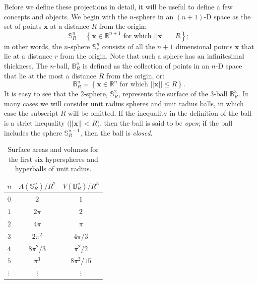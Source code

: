 Before we define these projections in detail, it will be useful to define a few concepts and objects.  We begin with the $n$-sphere in an $(n+1)$-D space as the set of points $\mathbf{x}$ at a distance $R$ from the origin:
\begin{equation}
	\mathbb{S}^n_R = \left\{ \mathbf{x}\in\mathbb{R}^{n+1} \text{ for which } \vert\vert\mathbf{x}\vert\vert = R\right\};
\end{equation}
in other words, the $n$-sphere $\mathbb{S}^n_r$ consists of all the $n+1$ dimensional points $\mathbf{x}$ that lie at a distance $r$ from the origin.  Note that such a sphere has an infinitesimal thickness.  The $n$-ball, $\mathbb{B}^n_R$ is defined as the collection of points in an $n$-D space that lie at the most a distance $R$ from the origin, or:
\begin{equation}
	\mathbb{B}^n_R = \left\{ \mathbf{x}\in\mathbb{R}^{n} \text{ for which } \vert\vert\mathbf{x}\vert\vert \le R\right\}.
\end{equation}
It is easy to see that the $2$-sphere, $\mathbb{S}^2_R$, represents the surface of the $3$-ball $\mathbb{B}^3_R$.  In many cases we will consider unit radius spheres and unit radius balls, in which case the subscript $R$ will be omitted.  If the inequality in the definition of the ball is a strict inequality $(\vert\vert\mathbf{x}\vert\vert$ < $R)$, then the ball is said to be \textit{open}; if the ball includes the sphere $\mathbb{S}^{n-1}_R$, then the ball is \textit{closed}.

\begin{table}[t]
\leavevmode\centering
\begin{tabular}{|l|c|c|}
\hline
$n$ & $A(\mathbb{S}^n_R)/R^2$ & $V(\mathbb{B}^n_R)/R^3$ \\
\hline\hline
$0$ & $2$ & $1$ \\ 
$1$ & $2\pi$ & $2$ \\
$2$ & $4\pi$ & $\pi$ \\
$3$ & $2\pi^2$ & $4\pi/3$ \\
$4$ & $8\pi^2/3$ & $\pi^2/2$ \\
$5$ & $\pi^3$ & $8\pi^2/15$ \\
$\vdots$ & $\vdots$ & $\vdots$\\
\hline
\end{tabular}
\caption{\label{\chabbr:tb:hyper}Surface areas and volumes for the first six hyperspheres and hyperballs of unit radius.}
\end{table}


